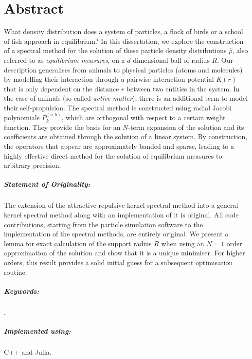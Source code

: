 \chapter*{Abstract}
\label{chap:abstract}
What density distribution does a system of particles, a flock of birds or a school of fish approach in equilibrium?
In this dissertation, we explore the construction of a spectral method for the solution of these particle density distributions $\hat{\rho}$, also referred to as \textit{equilibrium measures}, on a $d$-dimensional ball of radius $R$.
Our description generalises from animals to physical particles (atoms and molecules) by modelling their interaction through a pairwise interaction potential $K(r)$ that is only dependent on the distance $r$ between two entities in the system.
In the case of animals (so-called \textit{active matter}), there is an additional term to model their self-propulsion.
The spectral method is constructed using radial Jacobi polynomials $P_k^{(a,b)}$, which are orthogonal with respect to a certain weight function.
They provide the basis for an $N$-term expansion of the solution and its coefficients are obtained through the solution of a linear system.
By construction, the operators that appear are approximately banded and sparse, leading to a highly effective direct method for the solution of equilibrium measures to arbitrary precision.

\paragraph{Statement of Originality:}
The extension of the attractive-repulsive kernel spectral method into a general kernel spectral method along with an implementation of it is original.
All code contributions, starting from the particle simulation software to the implementation of the spectral methods, are entirely original.
We present a lemma for exact calculation of the support radius $R$ when using an $N = 1$ order approximation of the solution and show that it is a unique minimiser.
For higher orders, this result provides a solid initial guess for a subsequent optimisation routine.

\paragraph{Keywords:}
\thesiskeywords.

\paragraph{Implemented using:}
C++ and Julia.
